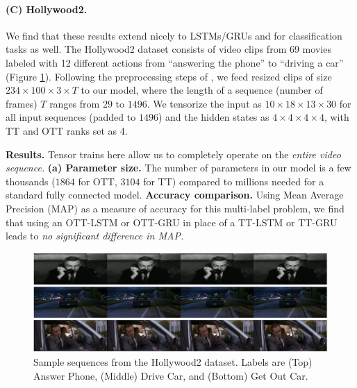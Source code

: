 \paragraph{(C) Hollywood2.}
We find
    that these results extend nicely to LSTMs/GRUs and for classification tasks
    as well. The Hollywood2 dataset \citep{marszalek09} consists of video clips from 69 movies
    labeled with 12 different actions from ``answering the phone'' to ``driving a car'' (Figure \ref{fig:hollywood}).
    Following the preprocessing steps of \cite{pmlr-v70-yang17e}, we feed resized
    clips of size $234 \times 100 \times 3 \times T$ to our model, where the length of a sequence
    (number of frames) $T$ ranges from $29$ to $1496$. We tensorize the
    input as $10 \times 18 \times 13 \times 30$ for all input sequences (padded to $1496$) and the
    hidden states as $4 \times 4 \times 4 \times 4$, with TT and OTT ranks set as 4.

\textbf{Results.} Tensor trains here allow us to completely operate on the \textit{entire video sequence.}
    \textbf{(a) Parameter size.}
    The number of parameters in our model is a few thousands ($1864$ for OTT, $3104$ for TT)
    compared to millions needed for a standard fully connected model.
\textbf{ Accuracy comparison.}
    Using Mean Average Precision (MAP) as a measure of accuracy for this multi-label problem, we
    find that using an OTT-LSTM or OTT-GRU in place of a TT-LSTM or TT-GRU leads to
    \textit{no significant difference in MAP.} 
\begin{figure}
	\centering
	\includegraphics[width=\columnwidth]{4_ott/figs/Hollywood2_samples.png}
	\caption[Sample sequences from the Hollywood2 dataset]{\label{fig:hollywood} Sample sequences from the Hollywood2 dataset. Labels are (Top) Answer Phone, (Middle) Drive Car, and (Bottom) Get Out Car.}
\end{figure}

